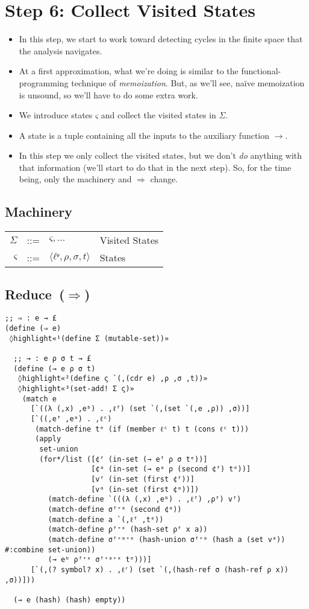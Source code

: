 \documentclass[12pt, oneside]{book}
\begin{document}
\section{Step 6: Collect Visited States}

\begin{itemize}
  \item In this step, we start to work toward detecting cycles in the finite space that the analysis navigates.
  \item At a first approximation, what we’re doing is similar to the functional-programming technique of \emph{memoization}. But, as we’ll see, naïve memoization is unsound, so we’ll have to do some extra work.
  \item We introduce states \(ς\) and collect the visited states in \(Σ\).
  \item A state is a tuple containing all the inputs to the auxiliary function \(→\).
  \item In this step we only collect the visited states, but we don’t \emph{do} anything with that information (we’ll start to do that in the next step). So, for the time being, only the machinery and \(⇒\) change.
\end{itemize}

\subsection{Machinery}

\begin{tabular}{rcll}
  \(Σ\) & ::= & \({ς, ...}\)      & Visited States \\
  \(ς\) & ::= & \(⟨ℓᵉ, ρ, σ, t⟩\) & States         \\
\end{tabular}

\subsection{Reduce~(\(⇒\))}

\begin{Verbatim}
;; ⇒ : e → £
(define (⇒ e)
 ◊highlight«¹(define Σ (mutable-set))»

  ;; → : e ρ σ t → £
  (define (→ e ρ σ t)
   ◊highlight«²(define ς `(,(cdr e) ,ρ ,σ ,t))»
   ◊highlight«³(set-add! Σ ς)»
    (match e
      [`((λ (,x) ,eᵇ) . ,ℓᶠ) (set `(,(set `(,e ,ρ)) ,σ))]
      [`((,eᶠ ,eᵃ) . ,ℓᶜ)
       (match-define tᵉ (if (member ℓᶜ t) t (cons ℓᶜ t)))
       (apply
        set-union
        (for*/list ([¢ᶠ (in-set (→ eᶠ ρ σ tᵉ))]
                    [¢ᵃ (in-set (→ eᵃ ρ (second ¢ᶠ) tᵉ))]
                    [vᶠ (in-set (first ¢ᶠ))]
                    [vᵃ (in-set (first ¢ᵃ))])
          (match-define `(((λ (,x) ,eᵇ) . ,ℓᶠ) ,ρᶠ) vᶠ)
          (match-define σᶠ⁺ᵃ (second ¢ᵃ))
          (match-define a `(,ℓᶠ ,tᵉ))
          (match-define ρᶠ⁺ˣ (hash-set ρᶠ x a))
          (match-define σᶠ⁺ᵃ⁺ˣ (hash-union σᶠ⁺ᵃ (hash a (set vᵃ)) #:combine set-union))
          (→ eᵇ ρᶠ⁺ˣ σᶠ⁺ᵃ⁺ˣ tᵉ)))]
      [`(,(? symbol? x) . ,ℓʳ) (set `(,(hash-ref σ (hash-ref ρ x)) ,σ))]))

  (→ e (hash) (hash) empty))
\end{Verbatim}
\end{document}
